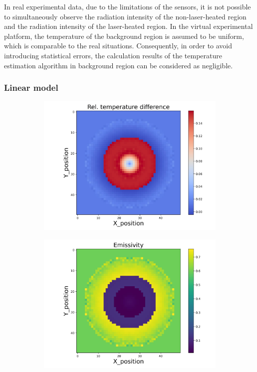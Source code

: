 In real experimental data, due to the limitations of the sensors, it is not 
possible to simultaneously observe the radiation intensity of the non-laser-heated 
region and the radiation intensity of the laser-heated region. In the 
virtual experimental platform, the temperature of the background region is 
assumed to be uniform, which is comparable to the real situations. 
Consequently, in order to avoid introducing statistical errors, the calculation 
results of the temperature estimation algorithm in background region can be 
considered as negligible.

\subsubsection{Linear model}

\begin{figure}[htbp]
    \centering
    \begin{minipage}{\textwidth}
        \centering
        \begin{subfigure}{0.49\textwidth}
            \centering
            \includegraphics[width=\textwidth]{figures/raw_data/21/linear/T_bias.jpg}
        \end{subfigure}
        \begin{subfigure}{0.49\textwidth}
            \centering
            \includegraphics[width=\textwidth]{figures/raw_data/21/linear/emi_cal.jpg}

\end{subfigure}
\end{minipage}
\end{figure}
